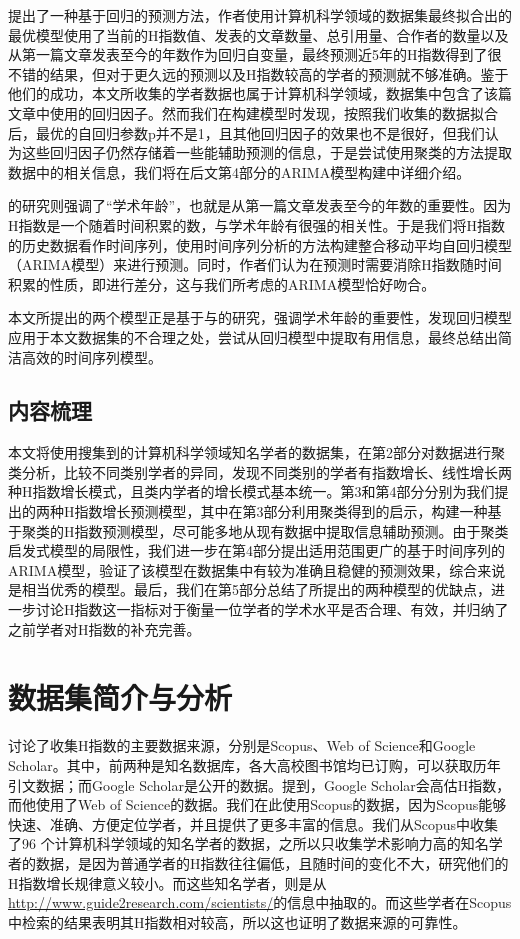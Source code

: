 \documentclass[lang=cn,11pt,a4paper,cite=authoryear]{elegantpaper}
\begin{document}
\cite{7397965}提出了一种基于回归的预测方法，作者使用计算机科学领域的数据集最终拟合出的最优模型使用了当前的H指数值、发表的文章数量、总引用量、合作者的数量以及从第一篇文章发表至今的年数作为回归自变量，最终预测近5年的H指数得到了很不错的结果，但对于更久远的预测以及H指数较高的学者的预测就不够准确。鉴于他们的成功，本文所收集的学者数据也属于计算机科学领域，数据集中包含了该篇文章中使用的回归因子。然而我们在构建模型时发现，按照我们收集的数据拟合后，最优的自回归参数p并不是1，且其他回归因子的效果也不是很好，但我们认为这些回归因子仍然存储着一些能辅助预测的信息，于是尝试使用聚类的方法提取数据中的相关信息，我们将在后文第4部分的ARIMA模型构建中详细介绍。

\cite{PennerPan-511}的研究则强调了“学术年龄”，也就是从第一篇文章发表至今的年数的重要性。因为H指数是一个随着时间积累的数，与学术年龄有很强的相关性。于是我们将H指数的历史数据看作时间序列，使用时间序列分析的方法构建整合移动平均自回归模型（ARIMA模型）来进行预测。同时，作者们认为在预测时需要消除H指数随时间积累的性质，即进行差分，这与我们所考虑的ARIMA模型恰好吻合。

本文所提出的两个模型正是基于\cite{7397965}与\cite{PennerPan-511}的研究，强调学术年龄的重要性，发现回归模型应用于本文数据集的不合理之处，尝试从回归模型中提取有用信息，最终总结出简洁高效的时间序列模型。

\subsection{内容梳理}

本文将使用搜集到的计算机科学领域知名学者的数据集，在第2部分对数据进行聚类分析，比较不同类别学者的异同，发现不同类别的学者有指数增长、线性增长两种H指数增长模式，且类内学者的增长模式基本统一。第3和第4部分分别为我们提出的两种H指数增长预测模型，其中在第3部分利用聚类得到的启示，构建一种基于聚类的H指数预测模型，尽可能多地从现有数据中提取信息辅助预测。由于聚类启发式模型的局限性，我们进一步在第4部分提出适用范围更广的基于时间序列的ARIMA模型，验证了该模型在数据集中有较为准确且稳健的预测效果，综合来说是相当优秀的模型。最后，我们在第5部分总结了所提出的两种模型的优缺点，进一步讨论H指数这一指标对于衡量一位学者的学术水平是否合理、有效，并归纳了之前学者对H指数的补充完善。


\section{数据集简介与分析}

\cite{Bar-Ilan2008}讨论了收集H指数的主要数据来源，分别是Scopus、Web of Science和Google Scholar。其中，前两种是知名数据库，各大高校图书馆均已订购，可以获取历年引文数据；而Google Scholar是公开的数据。\cite{Bar-Ilan2008}提到，Google Scholar会高估H指数，而他使用了Web of Science的数据。我们在此使用Scopus的数据，因为Scopus能够快速、准确、方便定位学者，并且提供了更多丰富的信息。我们从Scopus中收集了96 个计算机科学领域的知名学者的数据，之所以只收集学术影响力高的知名学者的数据，是因为普通学者的H指数往往偏低，且随时间的变化不大，研究他们的H指数增长规律意义较小。而这些知名学者，则是从\url{http://www.guide2research.com/scientists/}的信息中抽取的。而这些学者在Scopus中检索的结果表明其H指数相对较高，所以这也证明了数据来源的可靠性。
\end{document}
